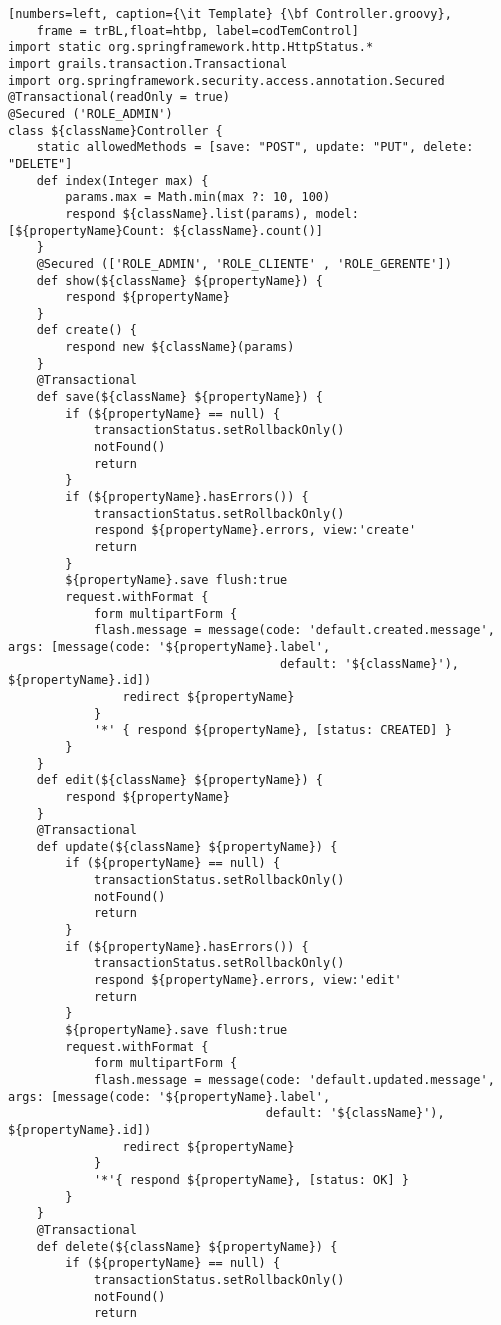 \begin{lstlisting}[numbers=left, caption={\it Template} {\bf Controller.groovy},
    frame = trBL,float=htbp, label=codTemControl]
import static org.springframework.http.HttpStatus.*
import grails.transaction.Transactional
import org.springframework.security.access.annotation.Secured
@Transactional(readOnly = true)
@Secured ('ROLE_ADMIN')
class ${className}Controller {
    static allowedMethods = [save: "POST", update: "PUT", delete: "DELETE"]
    def index(Integer max) {
        params.max = Math.min(max ?: 10, 100)
        respond ${className}.list(params), model:[${propertyName}Count: ${className}.count()]
    }
    @Secured (['ROLE_ADMIN', 'ROLE_CLIENTE' , 'ROLE_GERENTE'])
    def show(${className} ${propertyName}) {
        respond ${propertyName}
    }
    def create() {
        respond new ${className}(params)
    }
    @Transactional
    def save(${className} ${propertyName}) {
        if (${propertyName} == null) {
            transactionStatus.setRollbackOnly()
            notFound()
            return
        }
        if (${propertyName}.hasErrors()) {
            transactionStatus.setRollbackOnly()
            respond ${propertyName}.errors, view:'create'
            return
        }
        ${propertyName}.save flush:true
        request.withFormat {
            form multipartForm {
            flash.message = message(code: 'default.created.message', args: [message(code: '${propertyName}.label', 
                                      default: '${className}'), ${propertyName}.id])
                redirect ${propertyName}
            }
            '*' { respond ${propertyName}, [status: CREATED] }
        }
    }
    def edit(${className} ${propertyName}) {
        respond ${propertyName}
    }
    @Transactional
    def update(${className} ${propertyName}) {
        if (${propertyName} == null) {
            transactionStatus.setRollbackOnly()
            notFound()
            return
        }
        if (${propertyName}.hasErrors()) {
            transactionStatus.setRollbackOnly()
            respond ${propertyName}.errors, view:'edit'
            return
        }
        ${propertyName}.save flush:true
        request.withFormat {
            form multipartForm {
            flash.message = message(code: 'default.updated.message', args: [message(code: '${propertyName}.label', 
                                    default: '${className}'), ${propertyName}.id])
                redirect ${propertyName}
            }
            '*'{ respond ${propertyName}, [status: OK] }
        }
    }
    @Transactional
    def delete(${className} ${propertyName}) {
        if (${propertyName} == null) {
            transactionStatus.setRollbackOnly()
            notFound()
            return

\end{lstlisting}
